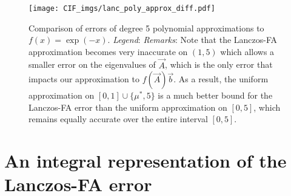 \begin{figure}[ht]
    \texttt{[image: CIF\_imgs/lanc\_poly\_approx\_diff.pdf]}

   \caption{
    Comparison of errors of degree 5 polynomial approximations to \( f(x) = \exp(-x) \).
    \emph{Legend}:
    \emph{Remarks}: 
    Note that the Lanczos-FA approximation becomes very inaccurate on \( (1,5) \) which allows a smaller error on the eigenvalues of $\vec A$, which is the only error that impacts our approximation to $f(\vec A)\vec b$.
    As a result, the uniform approximation on \( [0,1] \cup \{\mu^*,5\} \) is a much better bound for the Lanczos-FA error than the uniform approximation on \( [0,5] \), which remains equally accurate over the entire interval \([0,5]\). 
    }
    \label{fig:lanc_poly_approx}
\end{figure}
\fi

\section{An integral representation of the Lanczos-FA error}%
\label{sec:cif_bound}

